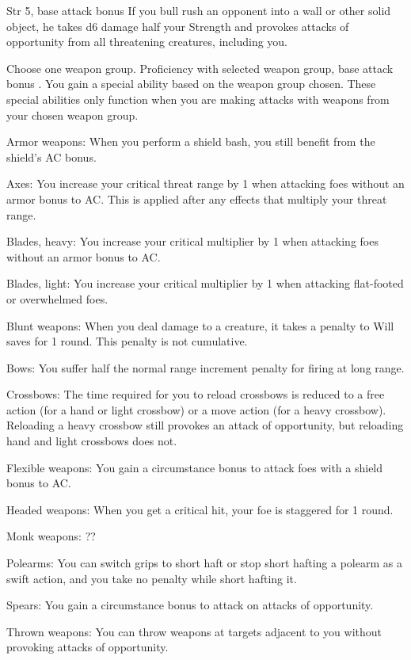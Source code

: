 
\featpre Str 5, base attack bonus 
\featben If you bull rush an opponent into a wall or other solid object, he takes d6 damage \add half your Strength and provokes attacks of opportunity from all threatening creatures, including you.

Choose one weapon group.
 Proficiency with selected weapon group, base attack bonus .
 You gain a special ability based on the weapon group chosen. These special abilities only function when you are making attacks with weapons from your chosen weapon group.
\begin{itemize*}
    \item Armor weapons: When you perform a shield bash, you still benefit from the shield's AC bonus.
    \item Axes: You increase your critical threat range by 1 when attacking foes without an armor bonus to AC. This is applied after any effects that multiply your threat range.
    \item Blades, heavy: You increase your critical multiplier by 1 when attacking foes without an armor bonus to AC.
    \item Blades, light: You increase your critical multiplier by 1 when attacking flat-footed or overwhelmed foes.
    \item Blunt weapons: When you deal damage to a creature, it takes a  penalty to Will saves for 1 round. This penalty is not cumulative.
    \item Bows: You suffer half the normal range increment penalty for firing at long range.
    \item Crossbows: The time required for you to reload crossbows is reduced to a free action (for a hand or light crossbow) or a move action (for a heavy crossbow). Reloading a heavy crossbow still provokes an attack of opportunity, but reloading hand and light crossbows does not.
    \item Flexible weapons: You gain a  circumstance bonus to attack foes with a shield bonus to AC.
    \item Headed weapons: When you get a critical hit, your foe is staggered for 1 round.
    \item Monk weapons: ??
    \item Polearms: You can switch grips to short haft or stop short hafting a polearm as a swift action, and you take no penalty while short hafting it.
    \item Spears: You gain a  circumstance bonus to attack on attacks of opportunity.
    \item Thrown weapons: You can throw weapons at targets adjacent to you without provoking attacks of opportunity.
\end{itemize*}
